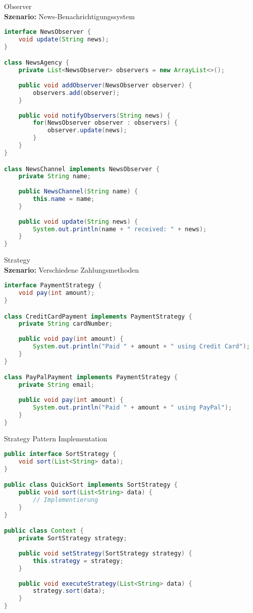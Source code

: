 \begin{example2}{Observer}\\
\textbf{Szenario:} News-Benachrichtigungssystem
\begin{lstlisting}[language=Java, style=base]
interface NewsObserver {
    void update(String news);
}

class NewsAgency {
    private List<NewsObserver> observers = new ArrayList<>();
    
    public void addObserver(NewsObserver observer) {
        observers.add(observer);
    }
    
    public void notifyObservers(String news) {
        for(NewsObserver observer : observers) {
            observer.update(news);
        }
    }
}

class NewsChannel implements NewsObserver {
    private String name;
    
    public NewsChannel(String name) {
        this.name = name;
    }
    
    public void update(String news) {
        System.out.println(name + " received: " + news);
    }
}
\end{lstlisting}
\end{example2}

\begin{example2}{Strategy}\\
\textbf{Szenario:} Verschiedene Zahlungsmethoden
\begin{lstlisting}[language=Java, style=base]
interface PaymentStrategy {
    void pay(int amount);
}

class CreditCardPayment implements PaymentStrategy {
    private String cardNumber;
    
    public void pay(int amount) {
        System.out.println("Paid " + amount + " using Credit Card");
    }
}

class PayPalPayment implements PaymentStrategy {
    private String email;
    
    public void pay(int amount) {
        System.out.println("Paid " + amount + " using PayPal");
    }
}
\end{lstlisting}
\end{example2}

\begin{examplecode}{Strategy Pattern Implementation}
\begin{lstlisting}[language=Java, style=basesmol]
public interface SortStrategy {
    void sort(List<String> data);
}

public class QuickSort implements SortStrategy {
    public void sort(List<String> data) {
        // Implementierung
    }
}

public class Context {
    private SortStrategy strategy;
    
    public void setStrategy(SortStrategy strategy) {
        this.strategy = strategy;
    }
    
    public void executeStrategy(List<String> data) {
        strategy.sort(data);
    }
}
\end{lstlisting}
\end{examplecode}

